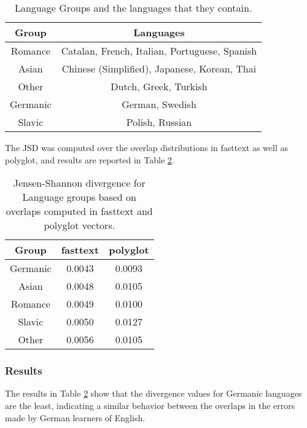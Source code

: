\documentclass[10pt,letterpaper]{article}
\begin{document}
\begin{table}[h]

\caption{\label{tab:lang_groups}Language Groups and the languages that they contain.}
\begin{center}
\begin{tabular}{|c|c|}
\toprule
\hline
\textbf{Group} & \textbf{Languages}\\
\midrule
\hline
Romance & Catalan, French, Italian, Portuguese, Spanish\\
Asian & Chinese (Simplified), Japanese, Korean, Thai\\
Other & Dutch, Greek, Turkish\\
Germanic & German, Swedish\\
Slavic & Polish, Russian\\
\bottomrule
\hline
\end{tabular}
\end{center}
\end{table}

The JSD was computed over the overlap distributions in fasttext as well as polyglot, and results are reported in Table \ref{tab:jsd}.

\begin{table}[h]

\caption{\label{tab:jsd}Jensen-Shannon divergence for Language groups based on overlaps computed in fasttext and polyglot vectors.}
\begin{center}
\begin{tabular}{|c|c|c|}
\toprule
\hline
\textbf{Group} & \textbf{fasttext} & \textbf{polyglot}\\
\midrule
\hline
Germanic & 0.0043 & 0.0093\\
Asian & 0.0048 & 0.0105\\
Romance & 0.0049 & 0.0100\\
Slavic & 0.0050 & 0.0127\\
Other & 0.0056 & 0.0105\\
\hline
\end{tabular}
\end{center}
\end{table}
\subsubsection{Results} The results in Table \ref{tab:jsd} show that the divergence values for Germanic languages are the least, indicating a similar behavior between the overlaps in the errors made by German learners of English. 
\end{document}
